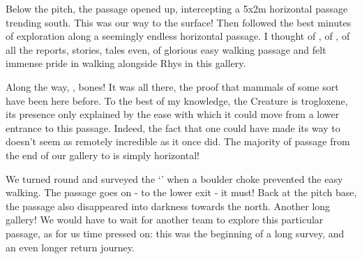 Below the pitch, the passage opened up, intercepting a 5x2m horizontal passage trending south. This was our way to the surface! Then followed the best minutes of exploration along a seemingly endless horizontal passage. I thought of , of , of all the reports, stories, tales even, of glorious easy walking passage and felt immense pride in walking alongside Rhys in this gallery.

Along the way, , bones! It was all there, the proof that mammals of some sort have been here before. To the best of my knowledge, the Creature is trogloxene, its presence only explained by the ease with which it could move from a lower entrance to this passage. Indeed, the fact that one could have made its way to  doesn't seem as remotely incredible as it once did. The majority of passage from the end of our gallery to  is simply horizontal!

We turned round and surveyed the `' when a boulder choke prevented the easy walking. The passage goes on - to the lower exit - it must! Back at the pitch base, the passage also disappeared into darkness towards the north. Another long gallery! We would have to wait for another team to explore this particular passage, as for us time pressed on: this was the beginning of a long survey, and an even longer return journey.

